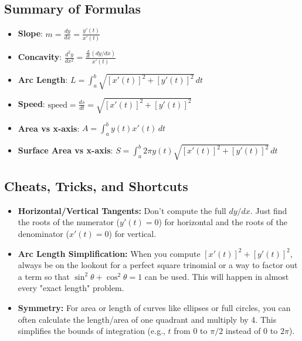 \documentclass{article}
\begin{document}
\subsection{Summary of Formulas}
\begin{itemize}
    \item \textbf{Slope}: $m = \displaystyle \frac{dy}{dx} = \frac{y'(t)}{x'(t)}$
    \item \textbf{Concavity}: $\displaystyle \frac{d^2y}{dx^2} = \frac{\frac{d}{dt}\left(dy/dx\right)}{x'(t)}$
    \item \textbf{Arc Length}: $L = \displaystyle \int_{a}^{b} \sqrt{[x'(t)]^2 + [y'(t)]^2} \, dt$
    \item \textbf{Speed}: $\text{speed} = \displaystyle \frac{ds}{dt} = \sqrt{[x'(t)]^2 + [y'(t)]^2}$
    \item \textbf{Area vs x-axis}: $A = \displaystyle \int_{a}^{b} y(t) x'(t) \, dt$
    \item \textbf{Surface Area vs x-axis}: $S = \displaystyle \int_{a}^{b} 2\pi y(t) \sqrt{[x'(t)]^2 + [y'(t)]^2} \, dt$
\end{itemize}

\subsection{Cheats, Tricks, and Shortcuts}
\begin{itemize}
    \item \textbf{Horizontal/Vertical Tangents:} Don't compute the full $dy/dx$. Just find the roots of the numerator ($y'(t)=0$) for horizontal and the roots of the denominator ($x'(t)=0$) for vertical.
    \item \textbf{Arc Length Simplification:} When you compute $[x'(t)]^2 + [y'(t)]^2$, always be on the lookout for a perfect square trinomial or a way to factor out a term so that $\sin^2\theta + \cos^2\theta = 1$ can be used. This will happen in almost every "exact length" problem.
    \item \textbf{Symmetry:} For area or length of curves like ellipses or full circles, you can often calculate the length/area of one quadrant and multiply by 4. This simplifies the bounds of integration (e.g., $t$ from $0$ to $\pi/2$ instead of $0$ to $2\pi$).
\end{itemize}
\end{document}
